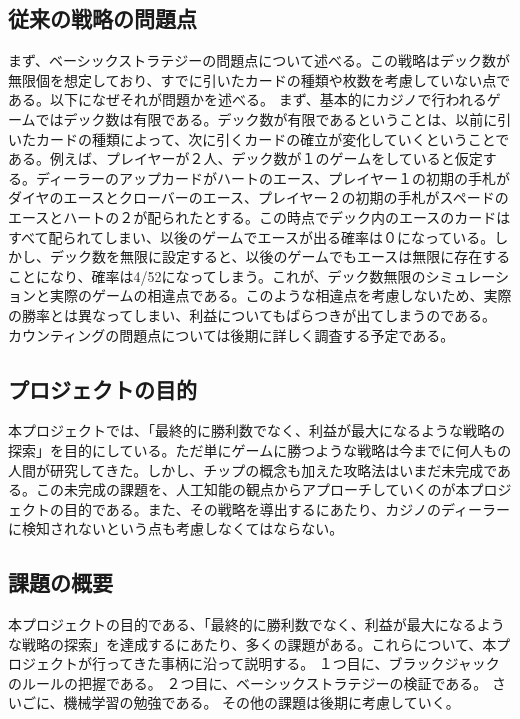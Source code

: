 \subsection{従来の戦略の問題点}
まず、ベーシックストラテジーの問題点について述べる。この戦略はデック数が無限個を想定しており、すでに引いたカードの種類や枚数を考慮していない点である。以下になぜそれが問題かを述べる。
まず、基本的にカジノで行われるゲームではデック数は有限である。デック数が有限であるということは、以前に引いたカードの種類によって、次に引くカードの確立が変化していくということである。例えば、プレイヤーが２人、デック数が１のゲームをしていると仮定する。ディーラーのアップカードがハートのエース、プレイヤー１の初期の手札がダイヤのエースとクローバーのエース、プレイヤー２の初期の手札がスペードのエースとハートの２が配られたとする。この時点でデック内のエースのカードはすべて配られてしまい、以後のゲームでエースが出る確率は０になっている。しかし、デック数を無限に設定すると、以後のゲームでもエースは無限に存在することになり、確率は4/52になってしまう。これが、デック数無限のシミュレーションと実際のゲームの相違点である。このような相違点を考慮しないため、実際の勝率とは異なってしまい、利益についてもばらつきが出てしまうのである。
カウンティングの問題点については後期に詳しく調査する予定である。

\subsection{プロジェクトの目的}
本プロジェクトでは、「最終的に勝利数でなく、利益が最大になるような戦略の探索」を目的にしている。ただ単にゲームに勝つような戦略は今までに何人もの人間が研究してきた。しかし、チップの概念も加えた攻略法はいまだ未完成である。この未完成の課題を、人工知能の観点からアプローチしていくのが本プロジェクトの目的である。また、その戦略を導出するにあたり、カジノのディーラーに検知されないという点も考慮しなくてはならない。

\subsection{課題の概要}
本プロジェクトの目的である、「最終的に勝利数でなく、利益が最大になるような戦略の探索」を達成するにあたり、多くの課題がある。これらについて、本プロジェクトが行ってきた事柄に沿って説明する。
１つ目に、ブラックジャックのルールの把握である。
２つ目に、ベーシックストラテジーの検証である。
さいごに、機械学習の勉強である。
その他の課題は後期に考慮していく。
